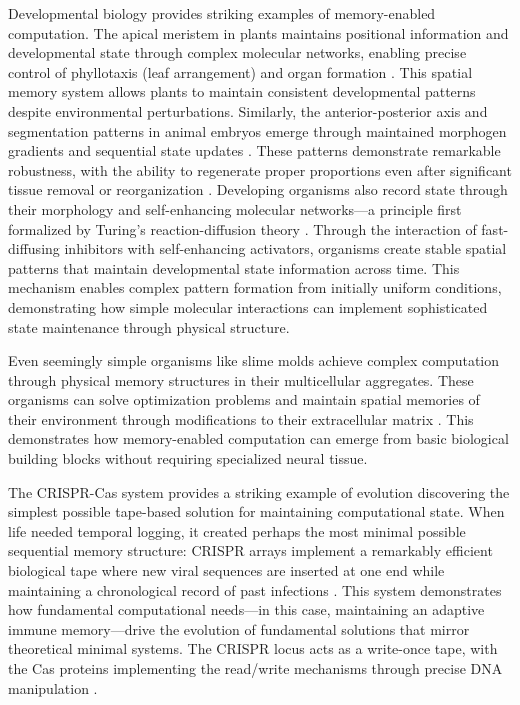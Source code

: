 \documentclass[12pt]{article}
\begin{document}
Developmental biology provides striking examples of memory-enabled computation.
The apical meristem in plants maintains positional information and developmental state through complex molecular networks, enabling precise control of phyllotaxis (leaf arrangement) and organ formation \cite{lovkvist2021using}.
This spatial memory system allows plants to maintain consistent developmental patterns despite environmental perturbations.
Similarly, the anterior-posterior axis and segmentation patterns in animal embryos emerge through maintained morphogen gradients and sequential state updates \cite{pastor2020computation}.
These patterns demonstrate remarkable robustness, with the ability to regenerate proper proportions even after significant tissue removal or reorganization \cite{lobo2012towards}.
Developing organisms also record state through their morphology and self-enhancing molecular networks---a principle first formalized by Turing's reaction-diffusion theory \cite{turing1952chemical}.
Through the interaction of fast-diffusing inhibitors with self-enhancing activators, organisms create stable spatial patterns that maintain developmental state information across time.
This mechanism enables complex pattern formation from initially uniform conditions, demonstrating how simple molecular interactions can implement sophisticated state maintenance through physical structure.

Even seemingly simple organisms like slime molds achieve complex computation through physical memory structures in their multicellular aggregates.
These organisms can solve optimization problems and maintain spatial memories of their environment through modifications to their extracellular matrix \cite{hoel2020emergence}.
This demonstrates how memory-enabled computation can emerge from basic biological building blocks without requiring specialized neural tissue.

The CRISPR-Cas system provides a striking example of evolution discovering the simplest possible tape-based solution for maintaining computational state.
When life needed temporal logging, it created perhaps the most minimal possible sequential memory structure: CRISPR arrays implement a remarkably efficient biological tape where new viral sequences are inserted at one end while maintaining a chronological record of past infections \cite{sheth2017multiplex}.
This system demonstrates how fundamental computational needs---in this case, maintaining an adaptive immune memory---drive the evolution of fundamental solutions that mirror theoretical minimal systems.
The CRISPR locus acts as a write-once tape, with the Cas proteins implementing the read/write mechanisms through precise DNA manipulation \cite{choi2022time}.
\end{document}
